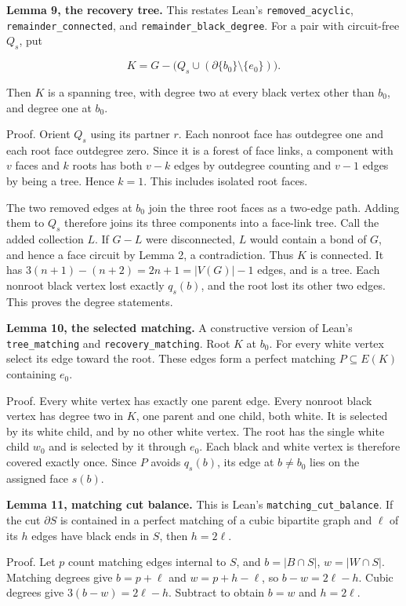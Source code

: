 \documentclass[a4paper,11pt]{amsart}
\begin{document}
\textbf{Lemma 9, the recovery tree.} This restates Lean's \nolinkurl{removed_acyclic}, \nolinkurl{remainder_connected}, and \nolinkurl{remainder_black_degree}. For a pair with circuit-free $Q_s$, put

\begin{equation*}
K=G-\bigl(Q_s\cup(\partial\{b_0\}\setminus\{e_0\})\bigr).
\end{equation*}

Then $K$ is a spanning tree, with degree two at every black vertex other than $b_0$, and degree one at $b_0$.

Proof. Orient $Q_s$ using its partner $r$. Each nonroot face has outdegree one and each root face outdegree zero. Since it is a forest of face links, a component with $v$ faces and $k$ roots has both $v-k$ edges by outdegree counting and $v-1$ edges by being a tree. Hence $k=1$. This includes isolated root faces.

The two removed edges at $b_0$ join the three root faces as a two-edge path. Adding them to $Q_s$ therefore joins its three components into a face-link tree. Call the added collection $L$. If $G-L$ were disconnected, $L$ would contain a bond of $G$, and hence a face circuit by Lemma 2, a contradiction. Thus $K$ is connected. It has $3(n+1)-(n+2)=2n+1=|V(G)|-1$ edges, and is a tree. Each nonroot black vertex lost exactly $q_s(b)$, and the root lost its other two edges. This proves the degree statements.

\textbf{Lemma 10, the selected matching.} A constructive version of Lean's \nolinkurl{tree_matching} and \nolinkurl{recovery_matching}. Root $K$ at $b_0$. For every white vertex select its edge toward the root. These edges form a perfect matching $P\subseteq E(K)$ containing $e_0$.

Proof. Every white vertex has exactly one parent edge. Every nonroot black vertex has degree two in $K$, one parent and one child, both white. It is selected by its white child, and by no other white vertex. The root has the single white child $w_0$ and is selected by it through $e_0$. Each black and white vertex is therefore covered exactly once. Since $P$ avoids $q_s(b)$, its edge at $b\ne b_0$ lies on the assigned face $s(b)$.

\textbf{Lemma 11, matching cut balance.} This is Lean's \nolinkurl{matching_cut_balance}. If the cut $\partial S$ is contained in a perfect matching of a cubic bipartite graph and $\ell$ of its $h$ edges have black ends in $S$, then $h=2\ell$.

Proof. Let $p$ count matching edges internal to $S$, and $b=|B\cap S|$, $w=|W\cap S|$. Matching degrees give $b=p+\ell$ and $w=p+h-\ell$, so $b-w=2\ell-h$. Cubic degrees give $3(b-w)=2\ell-h$. Subtract to obtain $b=w$ and $h=2\ell$.
\end{document}
